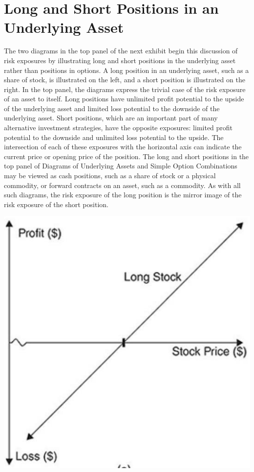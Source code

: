 \documentclass[11pt]{article}
\begin{document}
\section*{Long and Short Positions in an Underlying Asset}
The two diagrams in the top panel of the next exhibit begin this discussion of risk exposures by illustrating long and short positions in the underlying asset rather than positions in options. A long position in an underlying asset, such as a share of stock, is illustrated on the left, and a short position is illustrated on the right. In the top panel, the diagrams express the trivial case of the risk exposure of an asset to itself. Long positions have unlimited profit potential to the upside of the underlying asset and limited loss potential to the downside of the underlying asset. Short positions, which are an important part of many alternative investment strategies, have the opposite exposures: limited profit potential to the downside and unlimited loss potential to the upside. The intersection of each of these exposures with the horizontal axis can indicate the current price or opening price of the position. The long and short positions in the top panel of Diagrams of Underlying Assets and Simple Option Combinations may be viewed as cash positions, such as a share of stock or a physical commodity, or forward contracts on an asset, such as a commodity. As with all such diagrams, the risk exposure of the long position is the mirror image of the risk exposure of the short position.

\begin{center}
\includegraphics[max width=\textwidth]{2024_04_11_d71a2c9aea882dc3a7b2g-3(1)}
\end{center}
\end{document}
